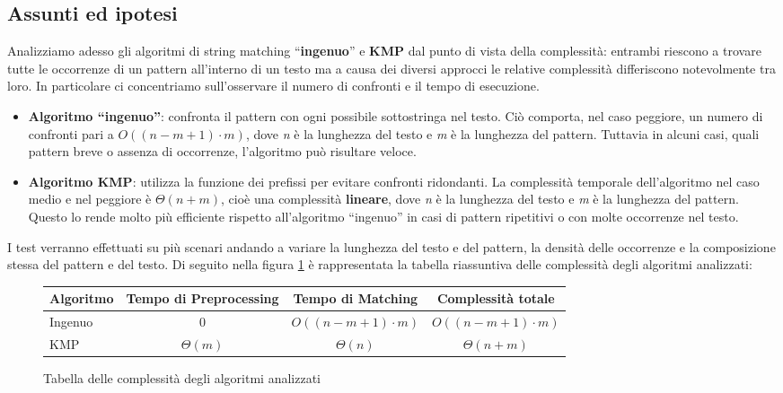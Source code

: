 \documentclass{article}
\begin{document}
\subsection{Assunti ed ipotesi}
Analizziamo adesso gli algoritmi di string matching ``\textbf{ingenuo}'' e \textbf{KMP} dal punto di vista della complessità: entrambi riescono a trovare tutte le occorrenze di un pattern all'interno di un testo ma a causa dei diversi approcci le relative complessità differiscono notevolmente tra loro. In particolare ci concentriamo sull'osservare il numero di confronti e il tempo di esecuzione.
\begin{itemize}
    \item \textbf{Algoritmo ``ingenuo''}: confronta il pattern con ogni possibile sottostringa nel testo. Ciò comporta, nel caso peggiore, un numero di confronti pari a $O((n - m + 1) \cdot m)$, dove \textit{n} è la lunghezza del testo e \textit{m} è la lunghezza del pattern. Tuttavia in alcuni casi, quali pattern breve o assenza di occorrenze, l'algoritmo può risultare veloce.
    \item \textbf{Algoritmo KMP}: utilizza la funzione dei prefissi per evitare confronti ridondanti. La complessità temporale dell'algoritmo nel caso medio e nel peggiore è $\Theta(n + m)$, cioè una complessità \textbf{lineare}, dove \textit{n} è la lunghezza del testo e \textit{m} è la lunghezza del pattern. Questo lo rende molto più efficiente rispetto all'algoritmo ``ingenuo'' in casi di pattern ripetitivi o con molte occorrenze nel testo.
\end{itemize}
I test verranno effettuati su più scenari andando a variare la lunghezza del testo e del pattern, la densità delle occorrenze e la composizione stessa del pattern e del testo.
\newpage
\noindent Di seguito nella figura \ref{tab:complexity-table} è rappresentata la tabella riassuntiva delle complessità degli algoritmi analizzati:
\begin{figure}[H]
    \begin{table}[H]
        \centering
        \begin{tabular}{>{\raggedright\arraybackslash}p{2cm}ccc}
            Algoritmo & Tempo di Preprocessing & Tempo di Matching        & Complessità totale       \\
            \midrule
            Ingenuo   & 0                      & $O((n - m + 1) \cdot m)$ & $O((n - m + 1) \cdot m)$ \\
            KMP       & $\Theta(m)$            & $\Theta(n)$              & $\Theta(n + m)$          \\
        \end{tabular}
    \end{table}
    \caption{Tabella delle complessità degli algoritmi analizzati}
    \label{tab:complexity-table}
\end{figure}
\end{document}
